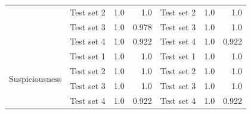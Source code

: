 \begin{table}[h]
\begin{tabular}{r|r|r|r|r|r|r }
                                                                                                                                 & Test set 2                   & 1.0                            & 1.0                         & Test set 2                   & 1.0                            & 1.0                         \\ \cline{2-7} 
                                                                                                                                 & Test set 3                   & 1.0                            & 0.978                       & Test set 3                   & 1.0                            & 1.0                         \\ \cline{2-7} 
                                                                                                                                 & Test set 4                   & 1.0                            & 0.922                       & Test set 4                   & 1.0                            & 0.922                       \\ \hline
\multirow{4}{*}{Suspiciousness}                                                                                                  & Test set 1                   & 1.0                            & 1.0                         & Test set 1                   & 1.0                            & 1.0                         \\ \cline{2-7} 
                                                                                                                                 & Test set 2                   & 1.0                            & 1.0                         & Test set 2                   & 1.0                            & 1.0                         \\ \cline{2-7} 
                                                                                                                                 & Test set 3                   & 1.0                            & 1.0                         & Test set 3                   & 1.0                            & 1.0                         \\ \cline{2-7} 
                                                                                                                                 & Test set 4                   & 1.0                            & 0.922                       & Test set 4                   & 1.0                            & 0.922                       \\ \hline
\end{tabular}
\end{table}

